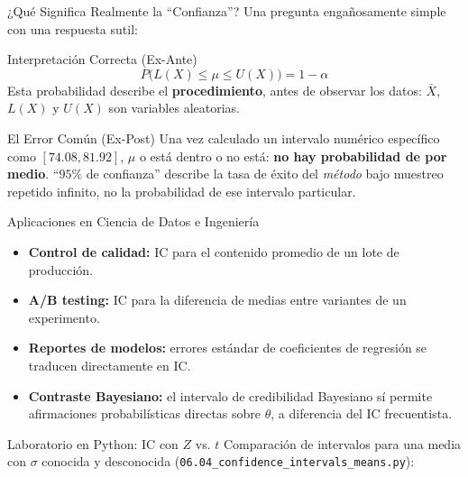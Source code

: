 \documentclass[10pt, aspectratio=169]{beamer}
\begin{document}
\begin{frame}{¿Qué Significa Realmente la ``Confianza''?}
  \footnotesize
  Una pregunta engañosamente simple con una respuesta sutil: \pause

  \vspace{0.1cm}
  \begin{block}{Interpretación Correcta (Ex-Ante)}
    $$P\big(L(X) \le \mu \le U(X)\big) = 1-\alpha$$
    Esta probabilidad describe el \textbf{procedimiento}, antes de observar los datos: $\bar X$, $L(X)$ y $U(X)$ son variables aleatorias.
  \end{block}

  \vspace{0.1cm}
  \pause
  \begin{alertblock}{El Error Común (Ex-Post)}
    Una vez calculado un intervalo numérico específico como $[74.08, 81.92]$, $\mu$ o está dentro o no está: \textbf{no hay probabilidad de por medio}. ``$95\%$ de confianza'' describe la tasa de éxito del \emph{método} bajo muestreo repetido infinito, no la probabilidad de ese intervalo particular.
  \end{alertblock}
\end{frame}

\begin{frame}{Aplicaciones en Ciencia de Datos e Ingeniería}
  \footnotesize
  \begin{itemize}\itemsep=0.1cm
    \item \textbf{Control de calidad:} IC para el contenido promedio de un lote de producción. \pause
    \item \textbf{A/B testing:} IC para la diferencia de medias entre variantes de un experimento. \pause
    \item \textbf{Reportes de modelos:} errores estándar de coeficientes de regresión se traducen directamente en IC. \pause
    \item \textbf{Contraste Bayesiano:} el intervalo de credibilidad Bayesiano sí permite afirmaciones probabilísticas directas sobre $\theta$, a diferencia del IC frecuentista.
  \end{itemize}
\end{frame}

\begin{frame}[fragile]{Laboratorio en Python: IC con $Z$ vs. $t$}
  \scriptsize
  Comparación de intervalos para una media con $\sigma$ conocida y desconocida (\texttt{06.04\_confidence\_intervals\_means.py}):
  {
  }
\end{frame}
\end{document}

